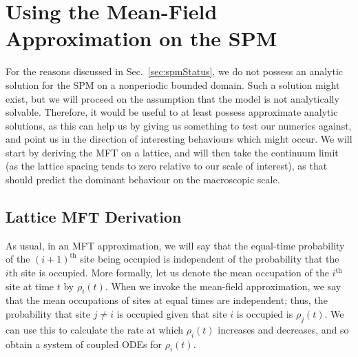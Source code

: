 \section{Using the Mean-Field Approximation on the SPM} \label{sec:spmMft}
For the reasons discussed in Sec.~\ref{sec:spmStatus}, we do not possess an analytic solution for the SPM on a nonperiodic bounded domain. Such a solution might exist, but
we will proceed on the assumption that the model is not analytically solvable. Therefore, it would be useful to at least possess approximate analytic solutions, as this can help us by giving us
something to test our numerics against, and point us in the direction of interesting behaviours which might occur. We will start by deriving the MFT on a lattice, and will then take the continuum limit (as the lattice spacing tends to zero
relative to our scale of interest), as that should predict the dominant behaviour on the macroscopic scale.


\subsection{Lattice MFT Derivation} 
\label{sec:latticeMFT}
As usual, in an MFT approximation, we will say that the equal-time probability of the $(i+1)^\mathrm{th}$ site being occupied is independent of the probability that the $i\mathrm{th}$ site is occupied.
More formally, let us denote the mean occupation of the $i^\mathrm{th}$ site at time $t$ by $\rho_i (t)$. When we invoke the mean-field approximation, we say that the mean occupations of sites at equal times are independent; thus,
the probability that site $j \ne i$ is occupied given that site $i$ is occupied is $\rho_j (t)$. We can use this to calculate the rate at which $\rho_i (t)$ increases and decreases, and so obtain a system of coupled ODEs for $\rho_i (t)$.


